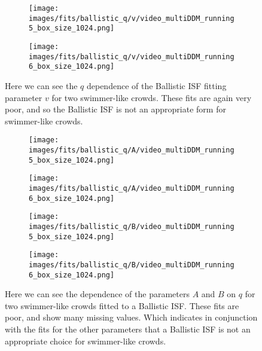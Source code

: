\documentclass[10pt]{article}
\begin{document}
\begin{figure}[H]
\begin{subfigure}[t]{.5\textwidth}
  \centering
  \texttt{[image: images/fits/ballistic\_q/v/video\_multiDDM\_running5\_box\_size\_1024.png]}
  \caption{}
\end{subfigure}%
\hfill
\begin{subfigure}[t]{.5\textwidth}
  \centering
  \texttt{[image: images/fits/ballistic\_q/v/video\_multiDDM\_running6\_box\_size\_1024.png]}
  \caption{}
\end{subfigure}
\caption{Here we can see the $q$ dependence of the Ballistic ISF fitting parameter $v$ for two swimmer-like crowds. These fits are again very poor, and so the Ballistic ISF is not an appropriate form for swimmer-like crowds.}
\label{fig:running_ballistic_fits_v}
\end{figure}

\begin{figure}[H]
\begin{subfigure}[t]{.5\textwidth}
  \centering
  \texttt{[image: images/fits/ballistic\_q/A/video\_multiDDM\_running5\_box\_size\_1024.png]}
  \caption{}
\end{subfigure}%
\hfill
\begin{subfigure}[t]{.5\textwidth}
  \centering
  \texttt{[image: images/fits/ballistic\_q/A/video\_multiDDM\_running6\_box\_size\_1024.png]}
  \caption{}
\end{subfigure}
\label{fig:running_ballistic_fits_A}
\par\bigskip
\begin{subfigure}[t]{.5\textwidth}
  \centering
  \texttt{[image: images/fits/ballistic\_q/B/video\_multiDDM\_running5\_box\_size\_1024.png]}
  \caption{}
\end{subfigure}%
\hfill
\begin{subfigure}[t]{.5\textwidth}
  \centering
  \texttt{[image: images/fits/ballistic\_q/B/video\_multiDDM\_running6\_box\_size\_1024.png]}
  \caption{}
\end{subfigure}
\caption{Here we can see the dependence of the parameters $A$ and $B$ on $q$ for two swimmer-like crowds fitted to a Ballistic ISF. These fits are poor, and show many missing values. Which indicates in conjunction with the fits for the other parameters that a Ballistic ISF is not an appropriate choice for swimmer-like crowds.}
\label{fig:running_ballistic_fits_B}
\end{figure}
\end{document}
